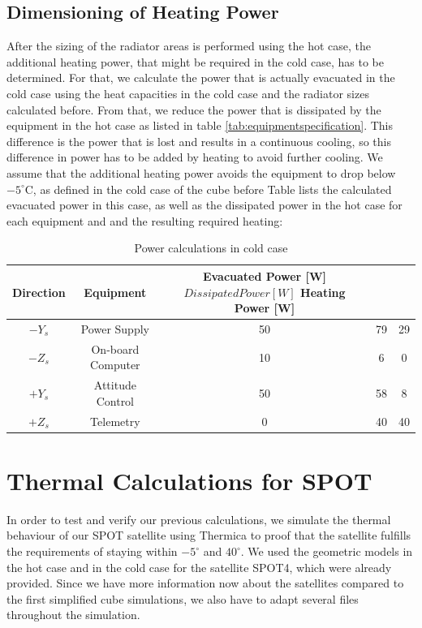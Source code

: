  
\subsection{Dimensioning of Heating Power}
After the sizing of the radiator areas is performed using the hot case, the additional heating power, that might be required in the cold case, has to be determined. For that, we calculate the power that is actually evacuated in the cold case using the heat capacities in the cold case and the radiator sizes calculated before. From that, we reduce the power that is dissipated by the equipment in the hot case as listed in table \ref{tab:equipmentspecification}. This difference is the power that is lost and results in a continuous cooling, so this difference in power has to be added by heating to avoid further cooling. We assume that the additional heating power avoids the equipment to drop below $-5^{\circ}$C, as defined in the cold case of the cube before Table lists the calculated evacuated power in this case, as well as the dissipated power in the hot case for each equipment and and the resulting required heating:

\begin{table}[H]
\centering
\begin{tabular}{ | c| c| c| c|c|}
\hline 
Direction& Equipment  & Evacuated Power [W] $ Dissipated Power [W] $ Heating Power [W] \\ \hline
$-Y_{s}$ & Power Supply &  50 & 79 & 29    \\ \hline
$-Z_{s}$ &On-board Computer &10 &6 &  0  \\\hline
$+Y_{s}$ &Attitude Control & 50 & 58 & 8  \\ \hline
$+Z_{s}$ &Telemetry  &  0   & 40 & 40 \\ \hline
\end{tabular}
\caption{Power calculations in cold case}
\label{tab:arrangement}
\end{table}

\section{Thermal Calculations for SPOT}
In order to test and verify our previous calculations, we simulate the thermal behaviour of our SPOT satellite using Thermica to proof that the satellite fulfills the requirements of staying within $-5^{\circ}$ and $40^{\circ}$. We used the geometric models in the hot case and in the cold case for the satellite SPOT4,  which were already provided. Since we have more information now about the satellites compared to the first simplified cube simulations, we also have to adapt several files throughout the simulation. 

